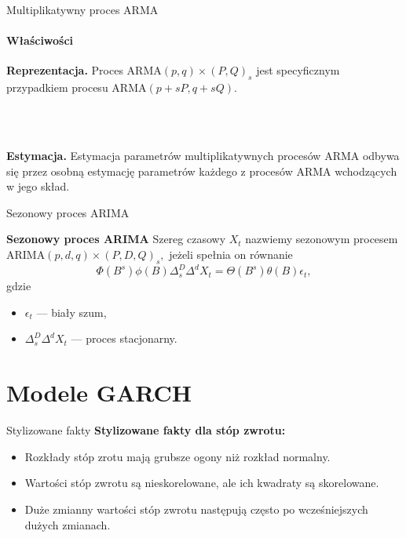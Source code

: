 \documentclass[a4paper, 11pt]{beamer}
\begin{document}
	\begin{frame}{Multiplikatywny proces ARMA}
		\framesubtitle{Właściwości}
		\begin{alert}{\textbf{Reprezentacja.}}
			Proces $\mbox{ARMA}\left(p, q\right)\times\left(P,Q\right)_s$ jest
			specyficznym przypadkiem procesu $\mbox{ARMA}\left(p+sP,q+sQ\right).$
		\end{alert}
		\\~\\
		\begin{alert}{\textbf{Estymacja.}}
			Estymacja parametrów multiplikatywnych procesów ARMA odbywa się przez osobną
			estymację parametrów każdego z procesów ARMA wchodzących w jego skład.
		\end{alert}
	\end{frame}
	
	\begin{frame}{Sezonowy proces ARIMA}
		\begin{block}{\textbf{Sezonowy proces ARIMA}}
			Szereg czasowy $X_t$ nazwiemy sezonowym procesem
			$\mbox{ARIMA}\left(p, d, q\right)\times\left(P,D,Q\right)_s,$
			jeżeli spełnia on równanie \[
				\Phi\left(B^s\right) \phi\left(B\right) \Delta_s^D \Delta^d X_t = \Theta\left(B^s\right) \theta\left(B\right) \epsilon_t,
			\] gdzie
			\begin{itemize}
				\item $\epsilon_t$ --- biały szum,
				\item $\Delta_s^D \Delta^d X_t$ --- proces stacjonarny.
			\end{itemize}
		\end{block}
	\end{frame}
	
	\section{Modele GARCH}
	
	\begin{frame}{Stylizowane fakty}
		\textbf{Stylizowane fakty dla stóp zwrotu:}
		\begin{itemize}
			\item Rozkłady stóp zrotu mają grubsze ogony niż rozkład normalny.
			\item Wartości stóp zwrotu są nieskorelowane, ale ich kwadraty są skorelowane.
			\item Duże zmianny wartości stóp zwrotu następują często po wcześniejszych dużych zmianach.
		\end{itemize}
	\end{frame}
	
\end{document}
